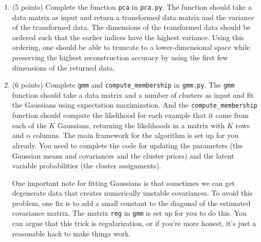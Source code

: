 \documentclass[10pt]{article}
\begin{document}
\begin{enumerate}

\item (5 points) Complete the function \texttt{pca} in \texttt{pca.py}. The function should take a data matrix as input and return a transformed data matrix and the variance of the transformed data. 
The dimensions of the transformed data should be ordered such that the earlier indices have the highest variance. Using this ordering, one should be able to truncate to a lower-dimensional space while preserving the highest reconstruction accuracy by using the first few dimensions of the returned data.

\item (6 points) Complete \texttt{gmm} and \texttt{compute\_membership} in \texttt{gmm.py}. The \texttt{gmm} function should take a data matrix and a number of clusters as input and fit the Gaussians using expectation maximization. 
And the \texttt{compute\_membership} function should compute the likelihood for each example that it came from each of the $K$ Gaussians, returning the likelihoods in a matrix with $K$ rows and $n$ columns. 
The main framework for the algorithm is set up for you already. You need to complete the code for updating the parameters (the Gaussian means and covariances and the cluster priors) and the latent variable probabilities (the cluster assignments).

One important note for fitting Gaussians is that sometimes we can get degenerate data that creates numerically unstable covariances. To avoid this problem, one fix is to add a small constant to the diagonal of the estimated covariance matrix. The matrix \texttt{reg} in \texttt{gmm} is set up for you to do this. You can argue that this trick is regularization, or if you're more honest, it's just a reasonable hack to make things work.


\end{enumerate}
\end{document}
